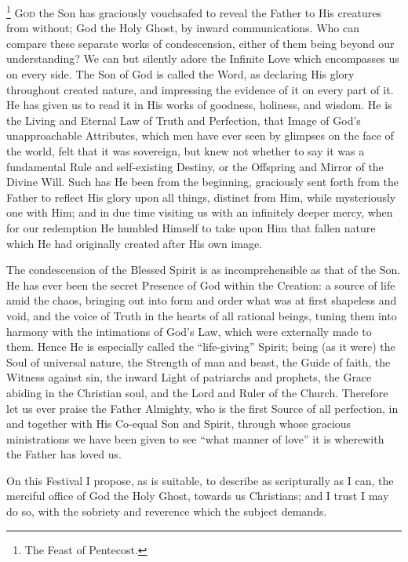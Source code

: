 \footnote{The Feast of Pentecost.} G\textsc{od} the Son has
graciously vouchsafed to reveal the Father to His creatures from
without; God the Holy Ghost, by inward communications. Who can compare
these separate works of condescension, either of them being beyond our
understanding? We can but silently adore the Infinite Love which
encompasses us on every side. The Son of God is called the Word, as
declaring His glory throughout created nature, and impressing the
evidence of it on every part of it. He has given us to read it in His
works of goodness, holiness, and wisdom. He is the Living and Eternal
Law of Truth and Perfection, that Image of God's unapproachable
Attributes, which men have ever seen by glimpses on the face of the
world, felt that it was sovereign, but knew not whether to say it was a
fundamental Rule and self-existing Destiny, or the Offspring and Mirror
of the Divine Will. Such has He been from the beginning, graciously sent
forth from the Father to reflect His glory upon all things, distinct
from Him, while mysteriously one with Him; and in due time visiting us
with an infinitely deeper mercy, when for our redemption He humbled
Himself to take upon Him that fallen nature which He had originally
created after His own image.

The condescension of the Blessed Spirit is as incomprehensible as
that of the Son. He has ever been the secret Presence of God within the
Creation: a source of life amid the chaos, bringing out into form and
order what was at first shapeless and void, and the voice of Truth in
the hearts of all rational beings, tuning them into harmony with the
intimations of God's Law, which were externally made to them. Hence He
is especially called the ``life-giving'' Spirit; being (as it
were) the Soul of universal nature, the Strength of man and beast, the
Guide of faith, the Witness against sin, the inward Light of patriarchs
and prophets, the Grace abiding in the Christian soul, and the Lord and
Ruler of the Church. Therefore let us ever praise the Father Almighty,
who is the first Source of all perfection, in and together with His
Co-equal Son and Spirit, through whose gracious ministrations we have
been given to see ``what manner of love'' it is wherewith the
Father has loved us.

On this Festival I propose, as is suitable, to describe as
scripturally as I can, the merciful office of God the Holy Ghost,
towards us Christians; and I trust I may do so, with the sobriety and
reverence which the subject demands.

